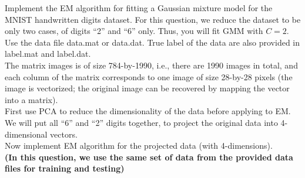 \documentclass[12pt]{article}
\begin{document}
Implement the EM algorithm for fitting a Gaussian mixture model for the MNIST handwritten digits dataset. For this question, we reduce the dataset to be only two cases, of digits ``2'' and ``6'' only. Thus, you will fit GMM with $C = 2$. Use the data file \textsf{data.mat} or \textsf{data.dat}. True label of the data are also provided in \textsf{label.mat} and \textsf{label.dat}.
\\

The matrix \textsf{images} is of size 784-by-1990, i.e., there are 1990 images in total, and each column of the matrix corresponds to one image of size 28-by-28 pixels (the image is vectorized; the original image can be recovered by mapping the vector into a matrix).  \\

First use PCA to reduce the dimensionality of the data before applying to EM. We will put all ``6'' and ``2'' digits together, to project the original data into 4-dimensional vectors. \\

Now implement EM algorithm for the projected data (with 4-dimensions). \\
\textbf{(In this question, we use the same set of data from the provided data files for training and testing)}
\end{document}
